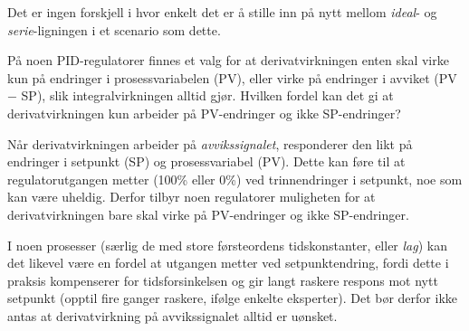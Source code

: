 Det er ingen forskjell i hvor enkelt det er å stille inn på nytt mellom {\it ideal}- og {\it serie}-ligningen i et scenario som dette.



På noen PID-regulatorer finnes et valg for at derivatvirkningen enten skal virke kun på endringer i prosessvariabelen (PV), eller virke på endringer i avviket (PV $-$ SP), slik integralvirkningen alltid gjør. Hvilken fordel kan det gi at derivatvirkningen kun arbeider på PV-endringer og ikke SP-endringer?







Når derivatvirkningen arbeider på {\it avvikssignalet}, responderer den likt på endringer i setpunkt (SP) og prosessvariabel (PV). Dette kan føre til at regulatorutgangen metter (100\% eller 0\%) ved trinnendringer i setpunkt, noe som kan være uheldig. Derfor tilbyr noen regulatorer muligheten for at derivatvirkningen bare skal virke på PV-endringer og ikke SP-endringer.







I noen prosesser (særlig de med store førsteordens tidskonstanter, eller {\it lag}) kan det likevel være en fordel at utgangen metter ved setpunktendring, fordi dette i praksis kompenserer for tidsforsinkelsen og gir langt raskere respons mot nytt setpunkt (opptil fire ganger raskere, ifølge enkelte eksperter). Det bør derfor ikke antas at derivatvirkning på avvikssignalet alltid er uønsket.



